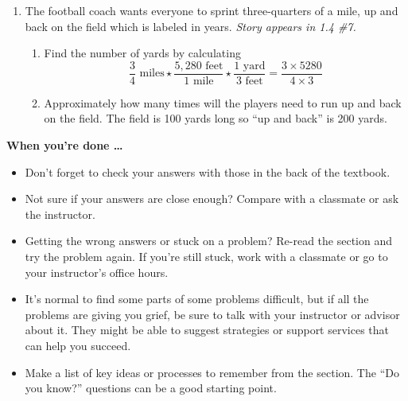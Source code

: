 \begin{enumerate}
\item The football coach wants everyone to sprint three-quarters of a mile, up and back on the field which is labeled in years.  \hfill \emph{Story appears in 1.4 \#7.}
\begin{enumerate}
\item Find the number of yards by calculating
$$\frac{3}{4} \text{ miles}
\star
  \frac{5,280 \text{ feet}}{1 \text{ mile}}
\star
  \frac{1 \text{ yard}}{3 \text{ feet}} = \frac{3 \times 5280}{4 \times 3}$$
  \item Approximately how many times will the players need to run up and back on the field.  The field is 100 yards long so ``up and back'' is 200 yards.  
  \end{enumerate}



  


\end{enumerate}

\bigskip

\noindent \textbf{When you're done \ldots}

\begin{itemize}
\item Don't forget to check your answers with those in the back of the textbook. 
\item Not sure if your answers are close enough? Compare with a classmate or ask the instructor.  
\item Getting the wrong answers or stuck on a problem?  Re-read the section and try the problem again.   If you're still stuck, work with a classmate or go to your instructor's office hours.
\item It's normal to find some parts of some problems difficult, but if all the problems are giving you grief, be sure to talk with your instructor or advisor about it.  They might be able to suggest strategies or support services that can help you succeed.
\item Make a list of key ideas or processes to remember from the section.  The ``Do you know?'' questions can be a good starting point.
\end{itemize}

